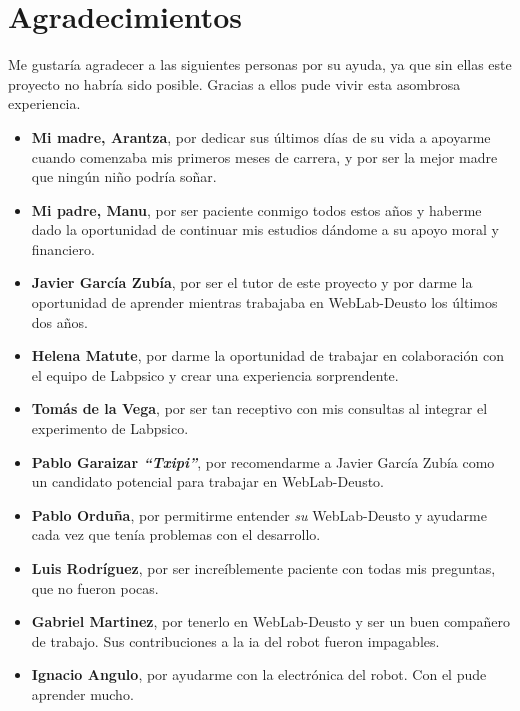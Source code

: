 \chapter*{Agradecimientos}

Me gustaría agradecer a las siguientes personas por su ayuda, ya que sin ellas este proyecto no
habría sido posible. Gracias a ellos pude vivir esta asombrosa experiencia.

\begin{itemize}
	\item \textbf{Mi madre, Arantza}, por dedicar sus últimos días de su vida a apoyarme cuando
	comenzaba mis primeros meses de carrera, y por ser la mejor madre que ningún niño podría soñar.

	\item \textbf{Mi padre, Manu}, por ser paciente conmigo todos estos años y haberme dado la
	oportunidad de continuar mis estudios dándome a su apoyo moral y financiero.

	\item \textbf{Javier García Zubía}, por ser el tutor de este proyecto y por darme la oportunidad
	de aprender mientras trabajaba en WebLab-Deusto los últimos dos años.

	\item \textbf{Helena Matute}, por darme la oportunidad de trabajar en colaboración con el equipo
	de Labpsico y crear una experiencia sorprendente.

	\item \textbf{Tomás de la Vega}, por ser tan receptivo con mis consultas al integrar el
	experimento de Labpsico.

	\item \textbf{Pablo Garaizar \emph{``Txipi''}}, por recomendarme a Javier García Zubía como un
	candidato potencial para trabajar en WebLab-Deusto.

	\item \textbf{Pablo Orduña}, por permitirme entender \emph{su} WebLab-Deusto y ayudarme cada
	vez que tenía problemas con el desarrollo.

	\item \textbf{Luis Rodríguez}, por ser increíblemente paciente con todas mis preguntas, que no
	fueron pocas.

	\item \textbf{Gabriel Martinez}, por tenerlo en WebLab-Deusto y ser un buen compañero de
	trabajo. Sus contribuciones a la \acrshort{ia} del robot fueron impagables.

	\item \textbf{Ignacio Angulo}, por ayudarme con la electrónica del robot. Con el pude aprender
	mucho.
\end{itemize}
